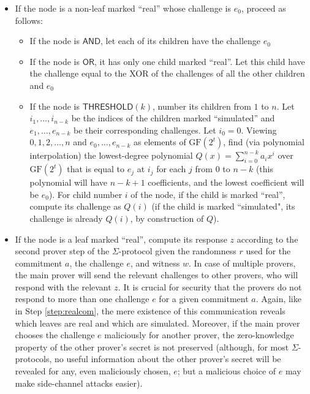 \documentclass[11pt]{article}
\newcommand{\andnode}{\ensuremath{\mathsf{AND}}}
\newcommand{\ornode}{\ensuremath{\mathsf{OR}}}
\newcommand{\tnode}{\ensuremath{\mathsf{THRESHOLD}}}
\newcommand{\GF}{\ensuremath{\mathrm{GF}}}
\begin{document}
\begin{enumerate}
    \begin{itemize}
        \item If the node is a non-leaf marked ``real'' whose challenge is $e_0$, proceed as follows:

        \begin{itemize}
            \item If the node is $\andnode$, let each of its children have the challenge $e_0$
            \item If the node is $\ornode$, it has only one child marked ``real''. Let this child have the challenge equal to the XOR of the challenges of all the other children and $e_0$
            \item If the node is $\tnode(k)$, number its children from $1$ to $n$. Let $i_1, \dots, i_{n-k}$ be the indices of the children marked ``simulated'' and $e_1, \dots,  e_{n-k}$ be their corresponding challenges. Let $i_0 = 0$. Viewing $0, 1, 2, \dots, n$ and $e_0, \dots, e_{n-k}$ as elements of $\GF(2^t)$, find (via polynomial interpolation) the lowest-degree polynomial $Q(x)=\sum_{i=0}^{n-k} a_i x^i $ over $\GF(2^t)$ that is equal to $e_j$ at $i_j$ for each $j$ from $0$ to $n-k$ (this polynomial will have $n-k+1$ coefficients, and the lowest coefficient will be $e_0$). For child number $i$ of the node, if the child is marked ``real'', compute its challenge as $Q(i)$ (if the child is marked ``simulated", its challenge is already $Q(i)$, by construction of $Q$).
        \end{itemize}

        \item If the node is a leaf marked ``real'', compute its response $z$ according to the second prover step of the $\Sigma$-protocol given the randomness $r$ used for the commitment $a$, the challenge $e$, and witness $w$. In case of multiple provers, the main prover will send the relevant challenges to other provers, who will respond with the relevant $z$. It is crucial for security that the provers do not respond to more than one challenge $e$ for a given commitment $a$. Again, like in Step \ref{step:realcom}, the mere existence of this communication reveals which leaves are real and which are simulated. Moreover, if the main prover chooses the challenge $e$ maliciously for another prover, the zero-knowledge property of the other prover's secret is not preserved (although, for most $\Sigma$-protocols, no useful information about the other prover's secret will be revealed for any, even maliciously chosen, $e$; but a malicious choice of $e$ may make side-channel attacks easier).


\end{itemize}
\end{enumerate}
\end{document}
